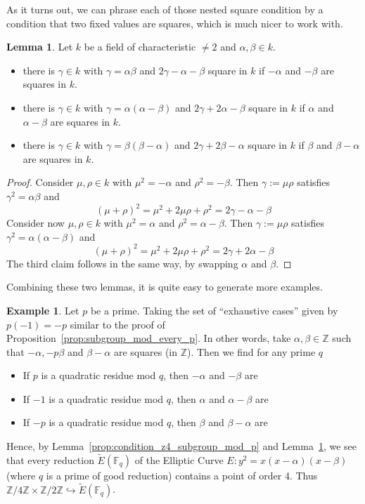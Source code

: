 \documentclass{scrartcl}
\newcommand{\Z}{\mathbb{Z}}
\newcommand{\F}{\mathbb{F}}
\theoremstyle{definition}
\newtheorem{lemma}[subsection]{Lemma}
\newtheorem{example}[subsection]{Example}
\begin{document}
As it turns out, we can phrase each of those nested square condition by a condition that two fixed values are squares, which is much nicer to work with.
\begin{lemma}
    \label{prop:condition_double_square}
    Let $k$ be a field of characteristic $\neq 2$ and $\alpha, \beta \in k$.
    \begin{itemize}
        \item there is $\gamma \in k$ with $\gamma = \alpha\beta$ and $2\gamma - \alpha - \beta$ square in $k$ if $-\alpha$ and $-\beta$ are squares in $k$.
        \item there is $\gamma \in k$ with $\gamma = \alpha(\alpha - \beta)$ and $2\gamma + 2\alpha - \beta$ square in $k$ if $\alpha$ and $\alpha - \beta$ are squares in $k$.
        \item there is $\gamma \in k$ with $\gamma = \beta(\beta - \alpha)$ and $2\gamma + 2\beta - \alpha$ square in $k$ if $\beta$ and $\beta - \alpha$ are squares in $k$.
    \end{itemize}
\end{lemma}
\begin{proof}
    Consider $\mu, \rho \in k$ with $\mu^2 = -\alpha$ and $\rho^2 = -\beta$.
    Then $\gamma := \mu\rho$ satisfies $\gamma^2 = \alpha\beta$ and
    \begin{equation*}
        (\mu + \rho)^2 = \mu^2 + 2\mu\rho + \rho^2 = 2\gamma -\alpha - \beta
    \end{equation*}
    Consider now $\mu, \rho \in k$ with $\mu^2 = \alpha$ and $\rho^2 = \alpha - \beta$.
    Then $\gamma := \mu\rho$ satisfies $\gamma^2 = \alpha(\alpha - \beta)$ and
    \begin{equation*}
        (\mu + \rho)^2 = \mu^2 + 2\mu\rho + \rho^2 = 2\gamma + 2\alpha - \beta
    \end{equation*}
    The third claim follows in the same way, by swapping $\alpha$ and $\beta$.
\end{proof}
Combining these two lemmas, it is quite easy to generate more examples.
\begin{example}
    Let $p$ be a prime.
    Taking the set of ``exhaustive cases'' given by $p(-1) = -p$ similar to the proof of Proposition~\ref{prop:subgroup_mod_every_p}.
    In other words, take $\alpha, \beta \in \Z$ such that $-\alpha, -p\beta$ and $\beta - \alpha$ are squares (in $\Z$).
    Then we find for any prime $q$
    \begin{itemize}
        \item If $p$ is a quadratic residue mod $q$, then $-\alpha$ and $-\beta$ are
        \item If $-1$ is a quadratic residue mod $q$, then $\alpha$ and $\alpha - \beta$ are
        \item If $-p$ is a quadratic residue mod $q$, then $\beta$ and $\beta - \alpha$ are
    \end{itemize}
    Hence, by Lemma~\ref{prop:condition_z4_subgroup_mod_p} and Lemma~\ref{prop:condition_double_square}, we see that every reduction $\tilde{E}(\F_q)$ of the Elliptic Curve $E: y^2 = x(x - \alpha)(x - \beta)$ (where $q$ is a prime of good reduction) contains a point of order 4.
    Thus $\Z/4\Z \times \Z/2\Z \hookrightarrow \tilde{E}(\F_q)$.
\end{example}
\end{document}
